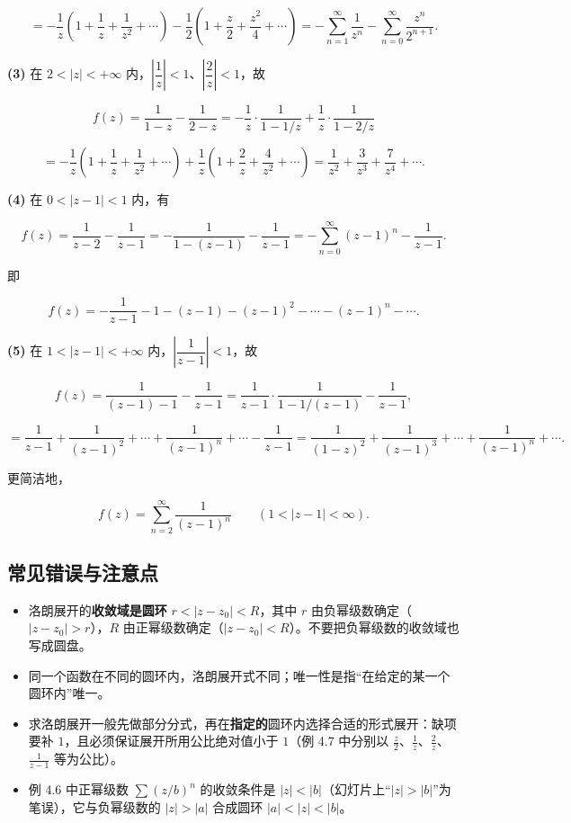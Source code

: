 \[
=-\frac{1}{z}\left(1+\frac{1}{z}+\frac{1}{z^2}+\cdots\right)-\frac{1}{2}\left(1+\frac{z}{2}+\frac{z^2}{4}+\cdots\right)
=-\sum_{n=1}^{\infty}\frac{1}{z^n}-\sum_{n=0}^{\infty}\frac{z^n}{2^{n+1}} .
\]

\textbf{(3)} 在 \(2<|z|<+\infty\)
内，\(\left|\dfrac{1}{z}\right|<1\)、\(\left|\dfrac{2}{z}\right|<1\)，故

\[
f(z)=\frac{1}{1-z}-\frac{1}{2-z}=-\frac{1}{z}\cdot\frac{1}{1-1/z}+\frac{1}{z}\cdot\frac{1}{1-2/z}
\]

\[
=-\frac{1}{z}\left(1+\frac{1}{z}+\frac{1}{z^2}+\cdots\right)+\frac{1}{z}\left(1+\frac{2}{z}+\frac{4}{z^2}+\cdots\right)
=\frac{1}{z^2}+\frac{3}{z^3}+\frac{7}{z^4}+\cdots .
\]

\textbf{(4)} 在 \(0<|z-1|<1\) 内，有

\[
f(z)=\frac{1}{z-2}-\frac{1}{z-1}=-\frac{1}{1-(z-1)}-\frac{1}{z-1}
=-\sum_{n=0}^{\infty}(z-1)^n-\frac{1}{z-1} .
\]

即

\[
f(z)=-\frac{1}{z-1}-1-(z-1)-(z-1)^2-\cdots-(z-1)^n-\cdots .
\]

\textbf{(5)} 在 \(1<|z-1|<+\infty\)
内，\(\left|\dfrac{1}{z-1}\right|<1\)，故

\[
f(z)=\frac{1}{(z-1)-1}-\frac{1}{z-1}=\frac{1}{z-1}\cdot\frac{1}{1-1/(z-1)}-\frac{1}{z-1},
\]

\[
=\frac{1}{z-1}+\frac{1}{(z-1)^2}+\cdots+\frac{1}{(z-1)^n}+\cdots-\frac{1}{z-1}
=\frac{1}{(1-z)^2}+\frac{1}{(z-1)^3}+\cdots+\frac{1}{(z-1)^n}+\cdots .
\]

更简洁地，

\[
f(z)=\sum_{n=2}^{\infty}\frac{1}{(z-1)^n}\qquad(1<|z-1|<\infty).
\]

\subsection{常见错误与注意点}\label{ux5e38ux89c1ux9519ux8befux4e0eux6ce8ux610fux70b9-14}

\begin{itemize}
\tightlist
\item
  洛朗展开的\textbf{收敛域是圆环} \(r<|z-z_0|<R\)，其中 \(r\)
  由负幂级数确定（\(|z-z_0|>r\)），\(R\)
  由正幂级数确定（\(|z-z_0|<R\)）。不要把负幂级数的收敛域也写成圆盘。
\item
  同一个函数在不同的圆环内，洛朗展开式不同；唯一性是指``在给定的某一个圆环内''唯一。
\item
  求洛朗展开一般先做部分分式，再在\textbf{指定的}圆环内选择合适的形式展开：缺项要补
  \(1\)，且必须保证展开所用公比绝对值小于 \(1\)（例 4.7 中分别以
  \(\frac{z}{2}\)、\(\frac{1}{z}\)、\(\frac{2}{z}\)、\(\frac{1}{z-1}\)
  等为公比）。
\item
  例 4.6 中正幂级数 \(\sum(z/b)^n\) 的收敛条件是
  \(|z|<|b|\)（幻灯片上``\(|z|>|b|\)''为笔误），它与负幂级数的
  \(|z|>|a|\) 合成圆环 \(|a|<|z|<|b|\)。
\end{itemize}

